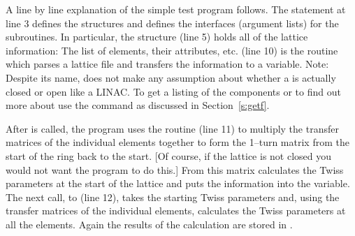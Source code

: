 A line by line explanation of the simple test program follows. 
The  statement at line 3
defines the \bmad structures and defines the interfaces
(argument lists) for the \bmad subroutines. In particular, the
 structure (line 5) holds all of the lattice
information: The list of elements, their attributes,
etc.  (line 10) is the routine which parses a lattice
file and transfers the information to a
 variable. Note: Despite its name, \bmad does
not make any assumption about whether a  is actually
closed or open like a LINAC. To get a listing of the 
components or to find out more about  use the 
command as discussed in Section~\ref{s:getf}.

After  is called, the program uses the
routine  (line 11) to multiply the transfer
matrices of the individual elements together to form the 1--turn
matrix from the start of the ring back to the start. [Of course,
if the lattice is not closed you would not want the program to do
this.] From this matrix
 calculates the Twiss parameters at the start of
the lattice and puts the information into the  variable. The
next call, to  (line 12), takes the starting
Twiss parameters and, using the transfer matrices of the individual
elements, calculates the Twiss parameters at all the elements. Again
the results of the calculation are stored in . 

